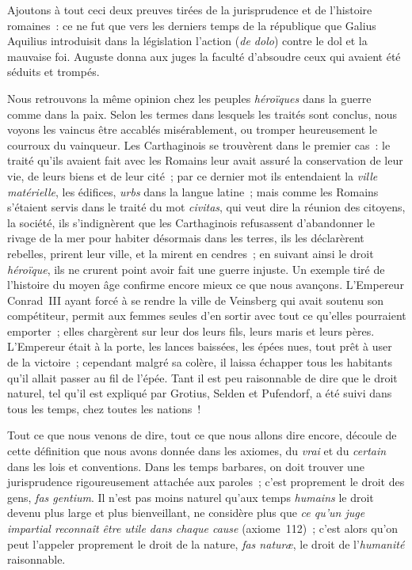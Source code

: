 \documentclass[french,twoside]{book} %
\begin{document}
\noindent Ajoutons à tout ceci deux preuves tirées de la jurisprudence et de l’histoire romaines : ce ne fut que vers les derniers temps de la république que Galius Aquilius introduisit dans la législation l’action ({\itshape de dolo}) contre le dol et la mauvaise foi. Auguste  donna aux juges la faculté d’absoudre ceux qui avaient été séduits et trompés.\par
Nous retrouvons la même opinion chez les peuples {\itshape héroïques} dans la guerre comme dans la paix. Selon les termes dans lesquels les traités sont conclus, nous voyons les vaincus être accablés misérablement, ou tromper heureusement le courroux du vainqueur. Les Carthaginois se trouvèrent dans le premier cas : le traité qu’ils avaient fait avec les Romains leur avait assuré la conservation de leur vie, de leurs biens et de leur cité ; par ce dernier mot ils entendaient la {\itshape ville matérielle}, les édifices, {\itshape urbs} dans la langue latine ; mais comme les Romains s’étaient servis dans le traité du mot {\itshape civitas}, qui veut dire la réunion des citoyens, la société, ils s’indignèrent que les Carthaginois refusassent d’abandonner le rivage de la mer pour habiter désormais dans les terres, ils les déclarèrent rebelles, prirent leur ville, et la mirent en cendres ; en suivant ainsi le droit {\itshape héroïque}, ils ne crurent point avoir fait une guerre injuste. Un exemple tiré de l’histoire du moyen âge confirme encore mieux ce que nous avançons. L’Empereur Conrad III ayant forcé à se rendre la ville de Veinsberg qui avait soutenu son compétiteur, permit aux femmes seules d’en sortir avec tout ce qu’elles pourraient emporter ; elles chargèrent sur leur dos leurs fils, leurs maris et leurs pères. L’Empereur était à la porte, les lances baissées, les épées nues, tout prêt à user de la victoire ; cependant malgré sa colère, il laissa échapper  tous les habitants qu’il allait passer au fil de l’épée. Tant il est peu raisonnable de dire que le droit naturel, tel qu’il est expliqué par Grotius, Selden et Pufendorf, a été suivi dans tous les temps, chez toutes les nations !\par
Tout ce que nous venons de dire, tout ce que nous allons dire encore, découle de cette définition que nous avons donnée dans les axiomes, du {\itshape vrai} et du {\itshape certain} dans les lois et conventions. Dans les temps barbares, on doit trouver une jurisprudence rigoureusement attachée aux paroles ; c’est proprement le droit des gens, {\itshape fas gentium}. Il n’est pas moins naturel qu’aux temps {\itshape humains} le droit devenu plus large et plus bienveillant, ne considère plus que {\itshape ce qu’un juge impartial reconnaît être utile dans chaque cause} (axiome 112) ; c’est alors qu’on peut l’appeler proprement le droit de la nature, {\itshape fas naturæ}, le droit de l’{\itshape humanité} raisonnable.\par
\end{document}
